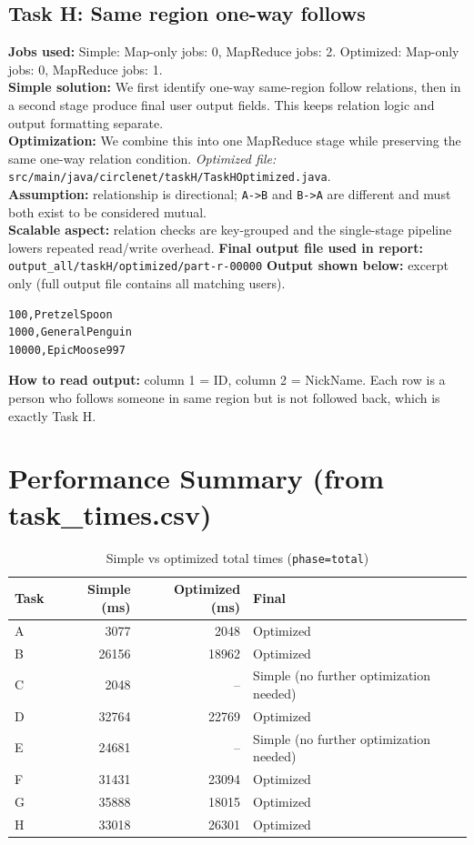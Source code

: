 \documentclass[11pt]{article}
\begin{document}
\subsection*{Task H: Same region one-way follows}
\textbf{Jobs used:} Simple: Map-only jobs: 0, MapReduce jobs: 2. Optimized: Map-only jobs: 0, MapReduce jobs: 1.\\
\textbf{Simple solution:} We first identify one-way same-region follow relations, then in a second stage produce final user output fields. This keeps relation logic and output formatting separate.\\
\textbf{Optimization:} We combine this into one MapReduce stage while preserving the same one-way relation condition. \textit{Optimized file:} \texttt{src/main/java/circlenet/taskH/TaskHOptimized.java}.\\
\textbf{Assumption:} relationship is directional; \texttt{A->B} and \texttt{B->A} are different and must both exist to be considered mutual.\\
\textbf{Scalable aspect:} relation checks are key-grouped and the single-stage pipeline lowers repeated read/write overhead.
\textbf{Final output file used in report:} \texttt{output\_all/taskH/optimized/part-r-00000}
\textbf{Output shown below:} excerpt only (full output file contains all matching users).
\begin{lstlisting}
100,PretzelSpoon
1000,GeneralPenguin
10000,EpicMoose997
\end{lstlisting}
\textbf{How to read output:} column 1 = ID, column 2 = NickName. Each row is a person who follows someone in same region but is not followed back, which is exactly Task H.

\section{Performance Summary (from task\_times.csv)}
\begin{table}[H]
\centering
\begin{tabular}{lrrl}
\toprule
Task & Simple (ms) & Optimized (ms) & Final \\
\midrule
A & 3077 & 2048 & Optimized \\
B & 26156 & 18962 & Optimized \\
C & 2048 & -- & Simple (no further optimization needed) \\
D & 32764 & 22769 & Optimized \\
E & 24681 & -- & Simple (no further optimization needed) \\
F & 31431 & 23094 & Optimized \\
G & 35888 & 18015 & Optimized \\
H & 33018 & 26301 & Optimized \\
\bottomrule
\end{tabular}
\caption{Simple vs optimized total times (\texttt{phase=total})}
\end{table}
\end{document}
